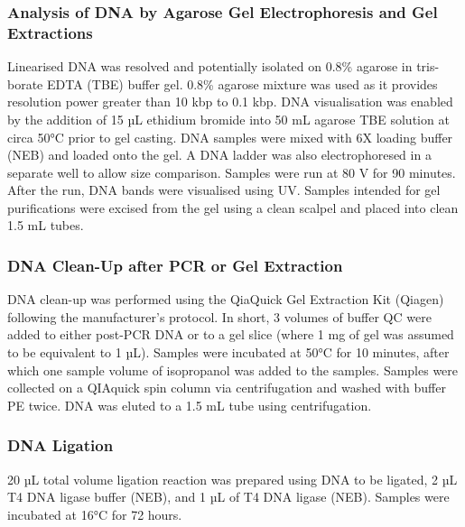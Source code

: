\subsubsection[DNA Agarose Gel Electrophoresis and Extractions]{Analysis of DNA by Agarose Gel Electrophoresis and Gel Extractions} \label{Analysis of DNA by Agarose Gel Electrophoresis and Gel Extractions}
Linearised DNA was resolved and potentially isolated on 0.8\% agarose in tris-borate EDTA (TBE) buffer gel. 0.8\% agarose mixture was used as it provides resolution power greater than 10 kbp to 0.1 kbp. DNA visualisation was enabled by the addition of 15 µL ethidium bromide into 50 mL agarose TBE solution at circa 50°C prior to gel casting. DNA samples were mixed with 6X loading buffer (NEB) and loaded onto the gel. A DNA ladder was also electrophoresed in a separate well to allow size comparison. Samples were run at 80 V for 90 minutes. After the run, DNA bands were visualised using UV. Samples intended for gel purifications were excised from the gel using a clean scalpel and placed into clean 1.5 mL tubes.

\subsubsection{DNA Clean-Up after PCR or Gel Extraction} \label{DNA Clean-Up After PCR or Gel Extraction}
DNA clean-up was performed using the QiaQuick Gel Extraction Kit (Qiagen) following the manufacturer's protocol. In short, 3 volumes of buffer QC were added to either post-PCR DNA or to a gel slice (where 1 mg of gel was assumed to be equivalent to 1 µL). Samples were incubated at 50°C for 10 minutes, after which one sample volume of isopropanol was added to the samples. Samples were collected on a QIAquick spin column via centrifugation and washed with buffer PE twice. DNA was eluted to a 1.5 mL tube using centrifugation.

\subsubsection{DNA Ligation} \label{DNA Ligation}
20 µL total volume ligation reaction was prepared using DNA to be ligated, 2 µL T4 DNA ligase buffer (NEB), and 1 µL of T4 DNA ligase (NEB). Samples were incubated at 16°C for 72 hours.

